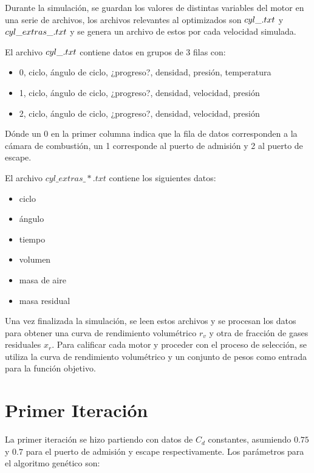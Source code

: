 Durante la simulación, se guardan los valores de distintas variables del motor
en una serie de archivos, los archivos relevantes al optimizados son
\emph{$cyl\_\*.txt$} y \emph{$cyl\_extras\_\*.txt$} y se genera un archivo de estos por
cada velocidad simulada.


El archivo \emph{$cyl\_\*.txt$} contiene datos en grupos de 3 filas con:

\begin{itemize}
        \item 0, ciclo, ángulo de ciclo, ¿progreso?, densidad, presión, temperatura
        \item 1, ciclo, ángulo de ciclo, ¿progreso?, densidad, velocidad, presión
        \item 2, ciclo, ángulo de ciclo, ¿progreso?, densidad, velocidad, presión
\end{itemize}

Dónde un 0 en la primer columna indica que la fila de datos corresponden a la
cámara de combustión, un 1 corresponde al puerto de admisión y 2 al puerto de
escape.

El archivo \emph{$cyl\_extras\_*.txt$} contiene los siguientes datos:
\begin{itemize}
  \item ciclo
  \item ángulo
  \item tiempo
  \item volumen
  \item masa de aire
  \item masa residual
\end{itemize}

Una vez finalizada la simulación, se leen estos archivos y se procesan los datos
para obtener una curva de rendimiento volumétrico $r_{v}$ y otra de fracción de
gases residuales $x_{r}$.
%
Para calificar cada motor y proceder con el proceso de selección, se utiliza la
curva de rendimiento volumétrico y un conjunto de pesos como entrada para la
función objetivo.
%

\section{Primer Iteración}

La primer iteración se hizo partiendo con datos de $C_{d}$ constantes, asumiendo
$0.75$ y $0.7$ para el puerto de admisión y escape respectivamente.
%
Los parámetros para el algoritmo genético son:

